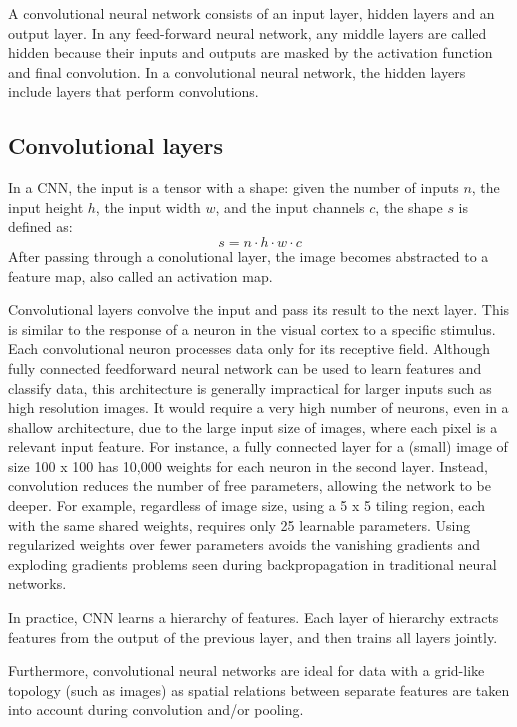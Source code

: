 A convolutional neural network consists of an input layer, hidden layers and an output layer. In any feed-forward neural network, any middle layers are called hidden because their inputs and outputs are masked by the activation function and final convolution. In a convolutional neural network, the hidden layers include layers that perform convolutions.

\subsection{Convolutional layers}
In a CNN, the input is a tensor with a shape: given the number of inputs \(n\), the input height \(h\), the input width \(w\), and the input channels \(c\), the shape \(s\) is defined as:
\begin{equation}
    s = n \cdot h \cdot w \cdot c
\end{equation}
After passing through a conolutional layer, the image becomes abstracted to a feature map, also called an activation map.

Convolutional layers convolve the input and pass its result to the next layer. This is similar to the response of a neuron in the visual cortex to a specific stimulus. Each convolutional neuron processes data only for its receptive field. Although fully connected feedforward neural network can be used to learn features and classify data, this architecture is generally impractical for larger inputs such as high resolution images. It would require a very high number of neurons, even in a shallow architecture, due to the large input size of images, where each pixel is a relevant input feature. For instance, a fully connected layer for a (small) image of size 100 x 100 has 10,000 weights for each neuron in the second layer. Instead, convolution reduces the number of free parameters, allowing the network to be deeper. For example, regardless of image size, using a 5 x 5 tiling region, each with the same shared weights, requires only 25 learnable parameters. Using regularized weights over fewer parameters avoids the vanishing gradients and exploding gradients problems seen during backpropagation in traditional neural networks.

In practice, CNN learns a hierarchy of features. Each layer of hierarchy extracts features from the output of the previous layer, and then trains all layers jointly.

Furthermore, convolutional neural networks are ideal for data with a grid-like topology (such as images) as spatial relations between separate features are taken into account during convolution and/or pooling.

